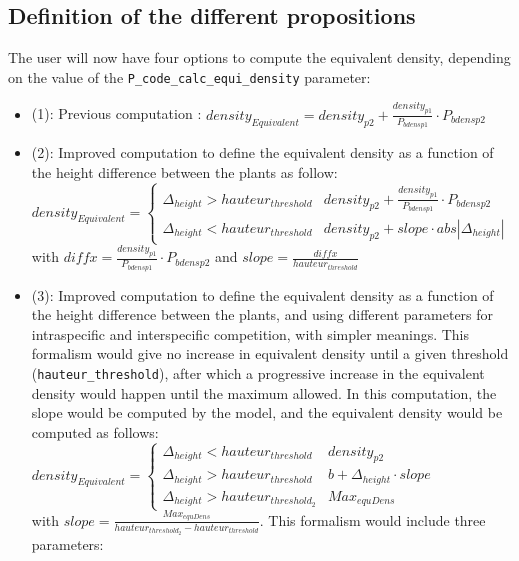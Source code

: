 \documentclass[
]{book}
\begin{document}
\hypertarget{definition-of-the-different-propositions}{%
\subsection{Definition of the different propositions}\label{definition-of-the-different-propositions}}

The user will now have four options to compute the equivalent density, depending on the value of the \texttt{P\_code\_calc\_equi\_density} parameter:

\begin{itemize}
\item
  (1): Previous computation : \(density_{Equivalent}= density_{p2} + \frac{density_{p1}}{P_{bdensp1}}\cdot P_{bdensp2}\)
\item
  (2): Improved computation to define the equivalent density as a function of the height difference between the plants as follow:
  \(density_{Equivalent} =\begin{cases}\Delta_{height} > hauteur_{threshold} & density_{p2} + \frac{density_{p1}}{P_{bdensp1}}\cdot P_{bdensp2} \\ \Delta_{height} < hauteur_{threshold} & density_{p2}+slope\cdot abs\left|\Delta_{height}\right| \end{cases}\)\\
  with \(diffx= \frac{density_{p1}}{P_{bdensp1}}\cdot P_{bdensp2}\) and \(slope= \frac{diffx}{hauteur_{threshold}}\)
\item
  (3): Improved computation to define the equivalent density as a function of the height difference between the plants, and using different parameters for intraspecific and interspecific competition, with simpler meanings. This formalism would give no increase in equivalent density until a given threshold (\texttt{hauteur\_threshold}), after which a progressive increase in the equivalent density would happen until the maximum allowed. In this computation, the slope would be computed by the model, and the equivalent density would be computed as follows: \(density_{Equivalent} =\begin{cases}\Delta_{height} < hauteur_{threshold} & density_{p2} \\ \Delta_{height} > hauteur_{threshold} & b + \Delta_{height}\cdot slope \\ \Delta_{height} > hauteur_{threshold_2} & Max_{equDens} \end{cases}\)\\
  with \(slope= \frac{Max_{equDens}}{hauteur_{threshold_2}-hauteur_{threshold}}\).
  This formalism would include three parameters:


\end{itemize}
\end{document}
